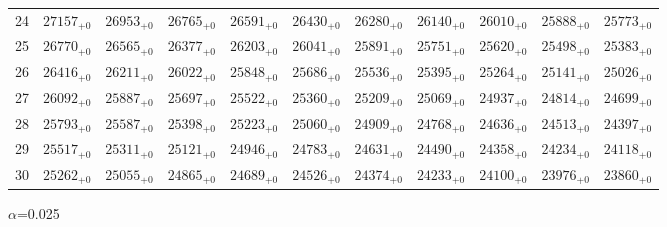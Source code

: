 \documentclass[10pt, a4paper]{article}
\begin{document}
\begin{center}
\begin{tabular}{c || c c c c c | c c c c c}
        24 & \({27157}_{+0}\) & \({26953}_{+0}\) & \({26765}_{+0}\) & \({26591}_{+0}\) & \({26430}_{+0}\) & \({26280}_{+0}\) & \({26140}_{+0}\) & \({26010}_{+0}\) & \({25888}_{+0}\) & \({25773}_{+0}\)\\
        25 & \({26770}_{+0}\) & \({26565}_{+0}\) & \({26377}_{+0}\) & \({26203}_{+0}\) & \({26041}_{+0}\) & \({25891}_{+0}\) & \({25751}_{+0}\) & \({25620}_{+0}\) & \({25498}_{+0}\) & \({25383}_{+0}\)\\
        \hline
        26 & \({26416}_{+0}\) & \({26211}_{+0}\) & \({26022}_{+0}\) & \({25848}_{+0}\) & \({25686}_{+0}\) & \({25536}_{+0}\) & \({25395}_{+0}\) & \({25264}_{+0}\) & \({25141}_{+0}\) & \({25026}_{+0}\)\\
        27 & \({26092}_{+0}\) & \({25887}_{+0}\) & \({25697}_{+0}\) & \({25522}_{+0}\) & \({25360}_{+0}\) & \({25209}_{+0}\) & \({25069}_{+0}\) & \({24937}_{+0}\) & \({24814}_{+0}\) & \({24699}_{+0}\)\\
        28 & \({25793}_{+0}\) & \({25587}_{+0}\) & \({25398}_{+0}\) & \({25223}_{+0}\) & \({25060}_{+0}\) & \({24909}_{+0}\) & \({24768}_{+0}\) & \({24636}_{+0}\) & \({24513}_{+0}\) & \({24397}_{+0}\)\\
        29 & \({25517}_{+0}\) & \({25311}_{+0}\) & \({25121}_{+0}\) & \({24946}_{+0}\) & \({24783}_{+0}\) & \({24631}_{+0}\) & \({24490}_{+0}\) & \({24358}_{+0}\) & \({24234}_{+0}\) & \({24118}_{+0}\)\\
        30 & \({25262}_{+0}\) & \({25055}_{+0}\) & \({24865}_{+0}\) & \({24689}_{+0}\) & \({24526}_{+0}\) & \({24374}_{+0}\) & \({24233}_{+0}\) & \({24100}_{+0}\) & \({23976}_{+0}\) & \({23860}_{+0}\)\\
        \hline
    \end{tabular}
    \pagebreak

    \(\alpha\)=0.025


\end{center}
\end{document}
